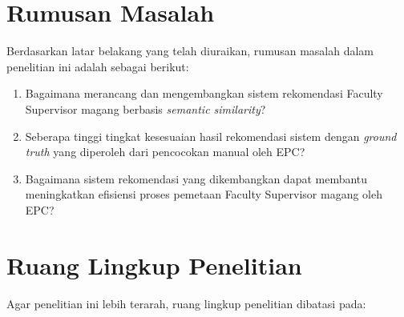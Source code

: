 \section{Rumusan Masalah}\label{rumusan-masalah}

Berdasarkan latar belakang yang telah diuraikan, rumusan masalah dalam penelitian ini adalah sebagai berikut:

\begin{enumerate}
\def\labelenumi{\arabic{enumi}.}
\item
  Bagaimana merancang dan mengembangkan sistem rekomendasi Faculty Supervisor magang berbasis \textit{semantic similarity}?
\item
  Seberapa tinggi tingkat kesesuaian hasil rekomendasi sistem dengan \textit{ground truth} yang diperoleh dari pencocokan manual oleh EPC?
\item
  Bagaimana sistem rekomendasi yang dikembangkan dapat membantu meningkatkan efisiensi proses pemetaan Faculty Supervisor magang oleh EPC?
\end{enumerate}

\section{Ruang Lingkup Penelitian}\label{ruang-lingkup-penelitian}

Agar penelitian ini lebih terarah, ruang lingkup penelitian dibatasi pada:

